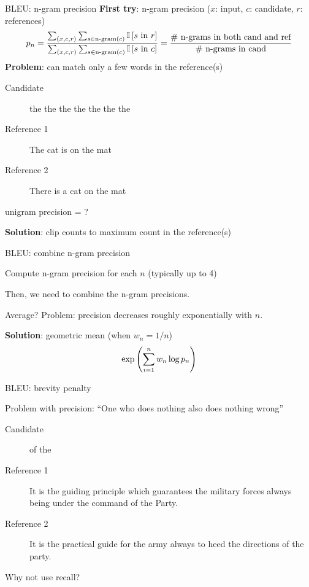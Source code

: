 \documentclass[usenames,dvipsnames,notes,11pt,aspectratio=169,hyperref={colorlinks=true, linkcolor=blue}]{beamer}
\newcommand{\pdfnote}[1]{}
\begin{document}
\begin{frame}
    {BLEU: n-gram precision}
    \textbf{First try}: n-gram precision ($x$: input, $c$: candidate, $r$: references)
    $$
    p_n = \frac{
        \sum_{(x,c,r)} \sum_{s\in\text{n-gram}(c)} \mathbb{I}\left[ s \text{ in } r \right]
    }
    {
\sum_{(x,c,r)} \sum_{s\in\text{n-gram}(c)} \mathbb{I}\left[ s \text{ in } c \right]
    } = \frac{
        \text{\# n-grams in both cand and ref}
    }{
        \text{\# n-grams in cand}
    }
    $$
    \pause
    \textbf{Problem}: can match only a few words in the reference(s)\\
    \begin{description}
        \item[Candidate] the the the the the the the
        \item[Reference 1] The cat is on the mat
        \item[Reference 2] There is a cat on the mat
    \end{description}
    unigram precision = ?

    \textbf{Solution}: clip counts to maximum count in the reference(s)
\end{frame}

\begin{frame}
    {BLEU: combine n-gram precision}

    Compute n-gram precision for each $n$ (typically up to 4)

    Then, we need to combine the n-gram precisions.

    Average? Problem: precision decreases roughly exponentially with $n$.

    \pause
    \textbf{Solution}: geometric mean (when $w_n=1/n$)
    $$
    \exp\left( \sum_{i=1}^n w_n \log p_n \right)
    $$
\end{frame}

\begin{frame}
    {BLEU: brevity penalty}

    Problem with precision: ``One who does nothing also does nothing wrong''

    \begin{description}
        \item[Candidate] of the 
        \item[Reference 1] It is the guiding principle which guarantees the military forces always being under the command of the Party. 
        \item[Reference 2] It is the practical guide for the army always to heed the directions of the party.
    \end{description}

    Why not use recall? %
    \pdfnote{
       BLEU does not use recall because the notion of recall is unclear when simultaneously matching against multiple reference translations (rather than a single reference).  
    }
\end{frame}
\end{document}
